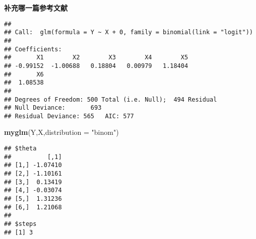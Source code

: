 \documentclass[]{ctexbook}
\newenvironment{Shaded}{\begin{snugshade}}{\end{snugshade}}
\newcommand{\CommentTok}[1]{\textcolor[rgb]{0.56,0.35,0.01}{\textit{#1}}}
\newcommand{\DataTypeTok}[1]{\textcolor[rgb]{0.13,0.29,0.53}{#1}}
\newcommand{\DecValTok}[1]{\textcolor[rgb]{0.00,0.00,0.81}{#1}}
\newcommand{\KeywordTok}[1]{\textcolor[rgb]{0.13,0.29,0.53}{\textbf{#1}}}
\newcommand{\NormalTok}[1]{#1}
\newcommand{\OperatorTok}[1]{\textcolor[rgb]{0.81,0.36,0.00}{\textbf{#1}}}
\newcommand{\StringTok}[1]{\textcolor[rgb]{0.31,0.60,0.02}{#1}}
\begin{document}
\textbf{补充哪一篇参考文献}

\begin{Shaded}
\end{Shaded}

\begin{verbatim}
## 
## Call:  glm(formula = Y ~ X + 0, family = binomial(link = "logit"))
## 
## Coefficients:
##       X1        X2        X3        X4        X5  
## -0.99152  -1.00688   0.18804   0.00979   1.18404  
##       X6  
##  1.08538  
## 
## Degrees of Freedom: 500 Total (i.e. Null);  494 Residual
## Null Deviance:       693 
## Residual Deviance: 565   AIC: 577
\end{verbatim}

\begin{Shaded}
\begin{Highlighting}[]
\KeywordTok{myglm}\NormalTok{(Y,X,}\DataTypeTok{distribution  =} \StringTok{"binom"}\NormalTok{)}
\end{Highlighting}
\end{Shaded}

\begin{verbatim}
## $theta
##          [,1]
## [1,] -1.07410
## [2,] -1.10161
## [3,]  0.13419
## [4,] -0.03074
## [5,]  1.31236
## [6,]  1.21068
## 
## $steps
## [1] 3
\end{verbatim}
\end{document}

